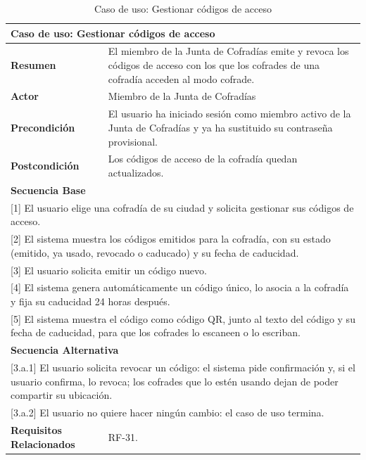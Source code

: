\begin{table}[h!]
    \centering
    \renewcommand{\arraystretch}{1.5}

    \begin{tabular}{|p{4cm}|p{11cm}|}
        \hline
        \multicolumn{2}{|l|}{\textbf{Caso de uso: Gestionar códigos de acceso}} \\
        \hline
        \textbf{Resumen} & El miembro de la Junta de Cofradías emite y revoca los códigos de acceso con los que los cofrades de una cofradía acceden al modo cofrade. \\
        \hline
        \textbf{Actor} & Miembro de la Junta de Cofradías \\
        \hline
        \textbf{Precondición} & El usuario ha iniciado sesión como miembro activo de la Junta de Cofradías y ya ha sustituido su contraseña provisional. \\
        \hline
        \textbf{Postcondición} & Los códigos de acceso de la cofradía quedan actualizados. \\
        \hline
        \multicolumn{2}{|l|}{\textbf{Secuencia Base}} \\
        \hline
        \multicolumn{2}{|p{15cm}|}{ [1] El usuario elige una cofradía de su ciudad y solicita gestionar sus códigos de acceso. } \\
        \hline
        \multicolumn{2}{|p{15cm}|}{ [2] El sistema muestra los códigos emitidos para la cofradía, con su estado (emitido, ya usado, revocado o caducado) y su fecha de caducidad. } \\
        \hline
        \multicolumn{2}{|p{15cm}|}{ [3] El usuario solicita emitir un código nuevo. } \\
        \hline
        \multicolumn{2}{|p{15cm}|}{ [4] El sistema genera automáticamente un código único, lo asocia a la cofradía y fija su caducidad 24 horas después. } \\
        \hline
        \multicolumn{2}{|p{15cm}|}{ [5] El sistema muestra el código como código QR, junto al texto del código y su fecha de caducidad, para que los cofrades lo escaneen o lo escriban. } \\
        \hline
        \multicolumn{2}{|l|}{\textbf{Secuencia Alternativa}} \\
        \hline
        \multicolumn{2}{|p{15cm}|}{ [3.a.1] El usuario solicita revocar un código: el sistema pide confirmación y, si el usuario confirma, lo revoca; los cofrades que lo estén usando dejan de poder compartir su ubicación. } \\
        \hline
        \multicolumn{2}{|p{15cm}|}{ [3.a.2] El usuario no quiere hacer ningún cambio: el caso de uso termina. } \\
        \hline
        \textbf{Requisitos Relacionados} & RF-31. \\
        \hline
    \end{tabular}
    \caption{Caso de uso: Gestionar códigos de acceso}
\end{table}
